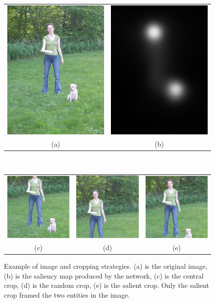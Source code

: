 \documentclass[12pt]{article}
\begin{document}
\begin{figure}
\scriptsize
\begin{center}
    \begin{tabular} {cc}
    \includegraphics[width=0.25\linewidth]{./img/crops/6-raw.JPEG} &
    \includegraphics[width=0.25\linewidth]{./img/crops/6-sals.png} \\
    (a) & (b) \\
    \end{tabular}\\
    \begin{tabular} {ccc}
    \includegraphics[width=0.2\linewidth]{./img/crops/6-central.JPEG} &
    \includegraphics[width=0.2\linewidth]{./img/crops/6-rand.JPEG} &
    \includegraphics[width=0.2\linewidth]{./img/crops/6-soft.JPEG} \\
    (c) & (d) & (e)\\
    \end{tabular}
\caption{\small Example of image and cropping strategies.
    (a) is the original image, (b) is the saliency map produced by the network,
    (c) is the central crop, (d) is the random crop, (e) is the salient crop.
    Only the salient crop framed the two entities in the image.}
\label{fig:exp2}
\end{center}
\end{figure}
\end{document}
